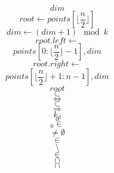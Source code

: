 \documentclass{scrreprt}
\begin{document}
\begin{equation}
dim
\end{equation}
\begin{equation}
root\gets{}points\left[\lfloor\frac{n}{2}\rfloor\right]
\end{equation}
\begin{equation}
dim\gets(dim+1)\mod{k}
\end{equation}
\begin{equation}
root.left \gets
\end{equation}
\begin{equation}
points\left[0:\lfloor\frac{n}{2}\rfloor-1\right], dim
\end{equation}
\begin{equation}
root.right \gets
\end{equation}
\begin{equation}
points\left[\lfloor\frac{n}{2}\rfloor+1:n-1\right], dim
\end{equation}
\begin{equation}
root
\end{equation}
\begin{equation}
\subset
\end{equation}
\begin{equation}
\Leftrightarrow
\end{equation}
\begin{equation}
\subset
\end{equation}
\begin{equation}
\Rightarrow
\end{equation}
\begin{equation}
k_d
\end{equation}
\begin{equation}
_0
\end{equation}
\begin{equation}
_0 \in
\end{equation}
\begin{equation}
\neq \emptyset
\end{equation}
\begin{equation}
\in
\end{equation}
\begin{equation}
\setminus
\end{equation}
\begin{equation}
\in
\end{equation}
\begin{equation}
\cap
\end{equation}
\begin{equation}
\cap
\end{equation}
\end{document}
